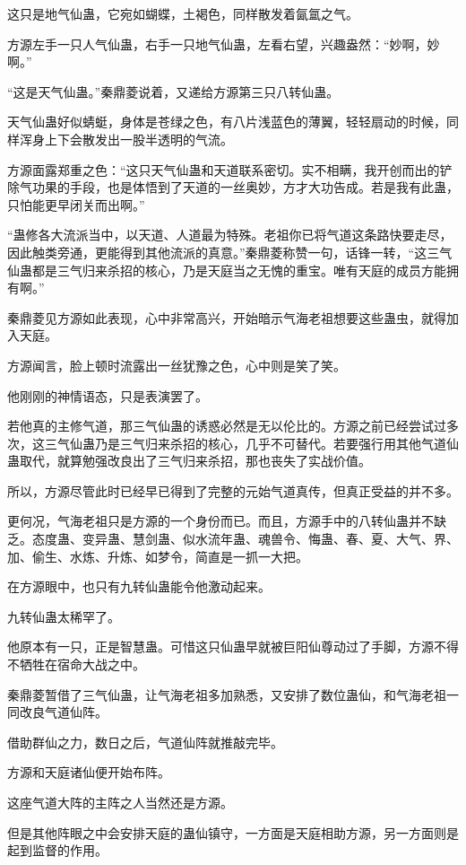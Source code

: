 \begin{this_body}
这只是地气仙蛊，它宛如蝴蝶，土褐色，同样散发着氤氲之气。

方源左手一只人气仙蛊，右手一只地气仙蛊，左看右望，兴趣盎然：“妙啊，妙啊。”

“这是天气仙蛊。”秦鼎菱说着，又递给方源第三只八转仙蛊。

天气仙蛊好似蜻蜓，身体是苍绿之色，有八片浅蓝色的薄翼，轻轻扇动的时候，同样浑身上下会散发出一股半透明的气流。

方源面露郑重之色：“这只天气仙蛊和天道联系密切。实不相瞒，我开创而出的铲除气功果的手段，也是体悟到了天道的一丝奥妙，方才大功告成。若是我有此蛊，只怕能更早闭关而出啊。”

“蛊修各大流派当中，以天道、人道最为特殊。老祖你已将气道这条路快要走尽，因此触类旁通，更能得到其他流派的真意。”秦鼎菱称赞一句，话锋一转，“这三气仙蛊都是三气归来杀招的核心，乃是天庭当之无愧的重宝。唯有天庭的成员方能拥有啊。”

秦鼎菱见方源如此表现，心中非常高兴，开始暗示气海老祖想要这些蛊虫，就得加入天庭。

方源闻言，脸上顿时流露出一丝犹豫之色，心中则是笑了笑。

他刚刚的神情语态，只是表演罢了。

若他真的主修气道，那三气仙蛊的诱惑必然是无以伦比的。方源之前已经尝试过多次，这三气仙蛊乃是三气归来杀招的核心，几乎不可替代。若要强行用其他气道仙蛊取代，就算勉强改良出了三气归来杀招，那也丧失了实战价值。

所以，方源尽管此时已经早已得到了完整的元始气道真传，但真正受益的并不多。

更何况，气海老祖只是方源的一个身份而已。而且，方源手中的八转仙蛊并不缺乏。态度蛊、变异蛊、慧剑蛊、似水流年蛊、魂兽令、悔蛊、春、夏、大气、界、加、偷生、水炼、升炼、如梦令，简直是一抓一大把。

在方源眼中，也只有九转仙蛊能令他激动起来。

九转仙蛊太稀罕了。

他原本有一只，正是智慧蛊。可惜这只仙蛊早就被巨阳仙尊动过了手脚，方源不得不牺牲在宿命大战之中。

秦鼎菱暂借了三气仙蛊，让气海老祖多加熟悉，又安排了数位蛊仙，和气海老祖一同改良气道仙阵。

借助群仙之力，数日之后，气道仙阵就推敲完毕。

方源和天庭诸仙便开始布阵。

这座气道大阵的主阵之人当然还是方源。

但是其他阵眼之中会安排天庭的蛊仙镇守，一方面是天庭相助方源，另一方面则是起到监督的作用。


\end{this_body}
